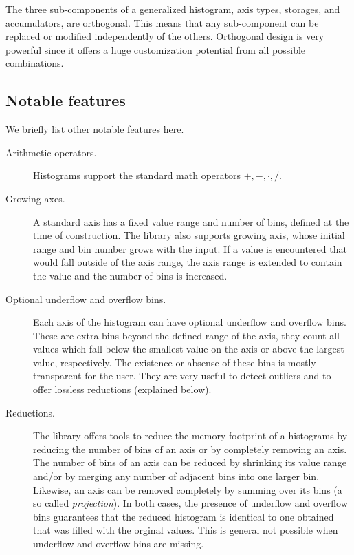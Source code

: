 \documentclass{webofc}
\begin{document}
The three sub-components of a generalized histogram, axis types, storages, and accumulators, are orthogonal. This means that any sub-component can be replaced or modified independently of the others. Orthogonal design is very powerful since it offers a huge customization potential from all possible combinations.

\subsection{Notable features}
\label{sec-bh-cpp-feat}

We briefly list other notable features here.

\begin{description}
\item[Arithmetic operators.] Histograms support the standard math operators $+, -, \cdot, /$.

\item[Growing axes.] A standard axis has a fixed value range and number of bins, defined at the time of construction. The library also supports growing axis, whose initial range and bin number grows with the input. If a value is encountered that would fall outside of the axis range, the axis range is extended to contain the value and the number of bins is increased.

\item[Optional underflow and overflow bins.] Each axis of the histogram can have optional underflow and overflow bins. These are extra bins beyond the defined range of the axis, they count all values which fall below the smallest value on the axis or above the largest value, respectively. The existence or absense of these bins is mostly transparent for the user. They are very useful to detect outliers and to offer lossless reductions (explained below).

\item[Reductions.] The library offers tools to reduce the memory footprint of a histograms by reducing the number of bins of an axis or by completely removing an axis. The number of bins of an axis can be reduced by shrinking its value range and/or by merging any number of adjacent bins into one larger bin. Likewise, an axis can be removed completely by summing over its bins (a so called \emph{projection}). In both cases, the presence of underflow and overflow bins guarantees that the reduced histogram is identical to one obtained that was filled with the orginal values. This is general not possible when underflow and overflow bins are missing.


\end{description}
\end{document}

